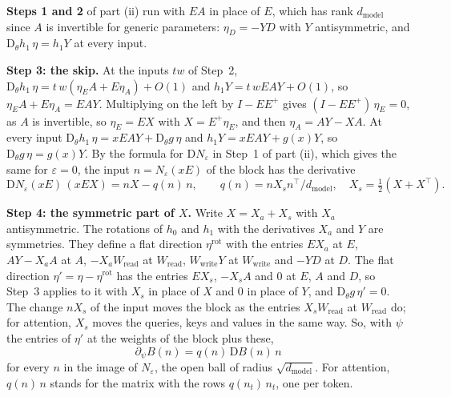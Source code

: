 \documentclass[10pt]{article}
\theoremstyle{definition}
\theoremstyle{remark}
\newcommand{\Wread}{W_{\mathrm{read}}}
\newcommand{\Wwrite}{W_{\mathrm{write}}}
\newcommand{\dm}{d_{\mathrm{model}}}
\newcommand{\Der}{\mathrm{D}}
\newcommand{\para}[1]{\smallskip\noindent\textbf{#1}\hspace{0.5em}}
\begin{document}
\para{Steps 1 and 2} of part (ii) run with $EA$ in place of $E$, which has rank $\dm$ since $A$ is invertible for generic parameters: $\eta_D = -YD$ with $Y$ antisymmetric, and $\Der_\theta h_1\,\eta = h_1Y$ at every input.

\para{Step 3: the skip.} At the inputs $tw$ of Step~2, $\Der_\theta h_1\,\eta = t\,w(\eta_EA + E\eta_A) + O(1)$ and $h_1Y = t\,wEAY + O(1)$, so $\eta_EA + E\eta_A = EAY$. Multiplying on the left by $I - EE^+$ gives $(I - EE^+)\,\eta_E = 0$, as $A$ is invertible, so $\eta_E = EX$ with $X = E^+\eta_E$, and then $\eta_A = AY - XA$. At every input $\Der_\theta h_1\,\eta = xEAY + \Der_\theta g\,\eta$ and $h_1Y = xEAY + g(x)Y$, so $\Der_\theta g\,\eta = g(x)Y$. By the formula for $\Der N_\varepsilon$ in Step~1 of part (ii), which gives the same for $\varepsilon = 0$, the input $n = N_\varepsilon(xE)$ of the block has the derivative
\[
\Der N_\varepsilon(xE)\,(xEX) = nX - q(n)\,n, \qquad q(n) = nX_sn^\top/\dm, \quad X_s = \tfrac12(X + X^\top).
\]

\para{Step 4: the symmetric part of $X$.} Write $X = X_a + X_s$ with $X_a$ antisymmetric. The rotations of $h_0$ and $h_1$ with the derivatives $X_a$ and $Y$ are symmetries. They define a flat direction $\eta^{\mathrm{rot}}$ with the entries $EX_a$ at $E$, $AY - X_aA$ at $A$, $-X_a\Wread$ at $\Wread$, $\Wwrite Y$ at $\Wwrite$ and $-YD$ at $D$. The flat direction $\eta' = \eta - \eta^{\mathrm{rot}}$ has the entries $EX_s$, $-X_sA$ and $0$ at $E$, $A$ and $D$, so Step~3 applies to it with $X_s$ in place of $X$ and $0$ in place of $Y$, and $\Der_\theta g\,\eta' = 0$. The change $nX_s$ of the input moves the block as the entries $X_s\Wread$ at $\Wread$ do; for attention, $X_s$ moves the queries, keys and values in the same way. So, with $\psi$ the entries of $\eta'$ at the weights of the block plus these,
\begin{equation}\label{eq:partc}
\partial_\psi B(n) = q(n)\,\Der B(n)\,n
\end{equation}
for every $n$ in the image of $N_\varepsilon$, the open ball of radius $\sqrt{\dm}$. For attention, $q(n)\,n$ stands for the matrix with the rows $q(n_t)\,n_t$, one per token.
\end{document}

